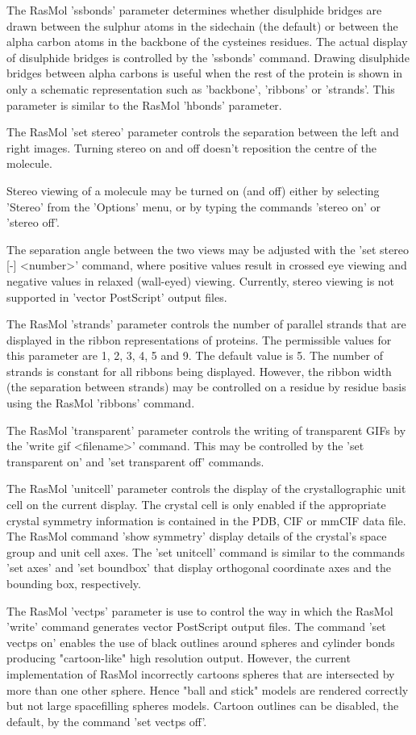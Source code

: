 The RasMol
'ssbonds'
parameter determines whether disulphide bridges are drawn between
the sulphur atoms in the sidechain (the default) or between the alpha
carbon atoms in the backbone of the cysteines residues. The actual
display of disulphide bridges is controlled by the
'ssbonds'
command. Drawing disulphide bridges between alpha carbons is useful
when the rest of the protein is shown in only a schematic
representation such as
'backbone',
'ribbons'
or
'strands'.
This parameter is similar to the RasMol
'hbonds'
parameter.

The RasMol
'set stereo'
parameter controls the separation between the left and
right images. Turning stereo on and off doesn't reposition
the centre of the molecule.

Stereo viewing of a molecule may be turned on (and off) either
by selecting
'Stereo'
from the
'Options'
menu, or by typing the commands
'stereo on'
or
'stereo off'.

The separation angle between the two views may be adjusted with the
'set stereo [-] <number>'
command, where positive values result in crossed eye viewing and
negative values in relaxed (wall-eyed) viewing. Currently, stereo viewing
is not supported in
'vector PostScript'
output files.

The RasMol
'strands'
parameter controls the number of parallel strands that are displayed
in the ribbon representations of proteins. The permissible values for
this parameter are 1, 2, 3, 4, 5 and 9. The default value is 5. The
number of strands is constant for all ribbons being displayed.
However, the ribbon width (the separation between strands) may be
controlled on a residue by residue basis using the RasMol
'ribbons'
command.

The RasMol
'transparent'
parameter controls the writing of transparent GIFs by the
'write gif <filename>'
command.  This may be controlled by the
'set transparent on'
and
'set transparent off'
commands.

The RasMol
'unitcell'
parameter controls the display of the crystallographic unit cell on
the current display. The crystal cell is only enabled if the appropriate
crystal symmetry information is contained in the PDB, CIF or mmCIF data
file. The
RasMol command
'show symmetry'
display details of the crystal's space group and unit cell axes. The
'set unitcell'
command is similar to the commands
'set axes'
and
'set boundbox'
that display orthogonal coordinate axes and the bounding box,
respectively.

The RasMol
'vectps'
parameter is use to control the way in which the RasMol
'write'
command generates vector PostScript output files. The command
'set vectps on'
enables the use of black outlines around spheres and cylinder bonds
producing "cartoon-like" high resolution output. However, the current
implementation of RasMol incorrectly cartoons spheres that are intersected
by more than one other sphere. Hence "ball and stick" models are rendered
correctly but not large spacefilling spheres models. Cartoon outlines
can be disabled, the default, by the command
'set vectps off'.

